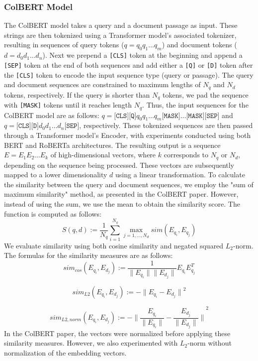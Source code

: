 \documentclass{article}
\begin{document}
\subsubsection{ColBERT Model}
The ColBERT model takes a query and a document passage as input. These strings are then tokenized using a Transformer model's associated tokenizer, resulting in sequences of query tokens ($q = q_0q_1\dots q_m$) and document tokens ($d = d_0d_1\dots d_n$). Next we prepend a \texttt{[CLS]} token at the beginning and append a \texttt{[SEP]} token at the end of both sequences and add either a \texttt{[Q]} or \texttt{[D]} token after the \texttt{[CLS]} token to encode the input sequence type (query or passage). The query and document sequences are constrained to maximum lengths of $N_q$ and $N_d$ tokens, respectively. If the query is shorter than $N_q$ tokens, we pad the sequence with \texttt{[MASK]} tokens until it reaches length $N_q$. Thus, the input sequences for the ColBERT model are as follows: $q = \texttt{[CLS]}\texttt{[Q]}q_0q_1 \dots q_m\texttt{[MASK]}\dots\texttt{[MASK]}\texttt{[SEP]}$ and $q = \texttt{[CLS]}\texttt{[D]}d_0d_1 \dots d_n\texttt{[SEP]}$, respectively. These tokenized sequences are then passed through a Transformer model's Encoder, with experiments conducted using both BERT and RoBERTa architectures. The resulting output is a sequence $E = E_1E_2 \dots E_k$ of high-dimensional vectors, where $k$ corresponds to $N_q$ or $N_d$, depending on the sequence being processed. These vectors are subsequently mapped to a lower dimensionality $d$ using a linear transformation. To calculate the similarity between the query and document sequences, we employ the "sum of maximum similarity" method, as presented in the ColBERT paper. However, instead of using the sum, we use the mean to obtain the similarity score. The function is computed as follows:
$$ S(q,d) := \frac{1}{N_q} \sum_{i=1}^{N_q} \max_{j = 1, \dots, N_d} sim(E_{q_i}, E_{q_j})
$$
We evaluate similarity using both cosine similarity and negated squared $L_2$-norm. The formulas for the similarity measures are as follows:
$$
sim_{cos}(E_{q_i}, E_{d_j}) := \frac{1}{\| E_{q_i} \|\| E_{d_j} \|} E_{q_i}E_{q_j}^T 
$$

$$
sim_{L2}(E_{q_i}, E_{d_j}) := -{\| E_{q_i} -E_{d_j} \|}^2
$$

$$
sim_{L2,norm}(E_{q_i}, E_{d_j}) := -{\| \frac{E_{q_i}}{\| E_{q_i} \|}  - \frac{E_{d_j}}{\| E_{d_j} \|} \|}^2
$$
In the ColBERT paper, the vectors were normalized before applying these similarity measures. However, we also experimented with $L_2$-norm without normalization of the embedding vectors.
\end{document}
